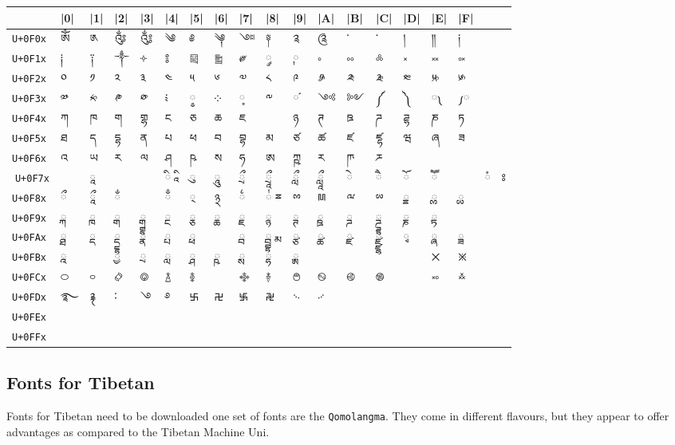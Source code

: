 \bgroup\large\tibetan
\begin{tabular}{llllllllllllllll l}
\toprule
	           &|0|	&|1|	&|2|	&|3|	&|4|	&|5|	&|6|	&|7|	&|8|	&|9|	&|A|	&|B|	&|C|	&|D|	&|E|	&|F|\\
\midrule
\texttt{U+0F0x}	&ༀ	&༁	&༂	&༃	&༄	&༅	&༆	&༇	&༈	&༉	&༊	&་	&༌  &	།	&༎	&༏\\
\midrule
\texttt{U+0F1x} &༐	&༑	&༒	&༓	&༔	&༕	&༖	&༗	&༘&	༙	&༚	&༛	&༜	&༝	&༞	&༟\\
\midrule
\texttt{U+0F2x} &༠	&༡	&༢	&༣	&༤	&༥	&༦	&༧	&༨	&༩	&༪	&༫	&༬	&༭	&༮	&༯\\
\midrule
\texttt{U+0F3x}	&༰ &༱	 &༲ &༳	&༴ &༵	&༶ & ༷	&༸&	༹	&༺&	༻	&༼&	༽	&༾	&༿\\
\midrule
\texttt{U+0F4x} &ཀ	&ཁ	&ག	&གྷ	&ང	&ཅ	&ཆ	&ཇ	&	&ཉ	&ཊ	&ཋ	&ཌ	&ཌྷ	&ཎ	&ཏ\\
\midrule
\texttt{U+0F5x}	 &ཐ	&ད	&དྷ	&ན	&པ	&ཕ	&བ	&བྷ	&མ	&ཙ	&ཚ	&ཛ	&ཛྷ	&ཝ	&ཞ	&ཟ\\
\midrule
\texttt{U+0F6x} &འ	&ཡ	&ར	&ལ	&ཤ	&ཥ	&ས	&ཧ	&ཨ	&ཀྵ	&ཪ	&ཫ	&ཬ	&&&\\
^^A\texttt{U+0F7x}&&	ཱ &	& &ི	ཱི&	ུ&	ཱུ&	ྲྀ&	ཷ&	ླྀ&	ཹ&	ེ&	ཻ&	ོ&	ཽ&	&ཾ	&ཿ\\
\midrule
\texttt{U+0F8x}&    ྀ   & 	ཱྀ&	ྂ&	&ྃ &	྄	&྅&	྆	&྇	ྈ&	ྉ&	ྊ&	ྋ&	ྌ&	ྍ&	ྎ&	ྏ\\
\midrule
\texttt{U+0F9x} &	ྐ&	ྑ   & 	ྒ &	ྒྷ &	ྔ &	ྕ &	ྖ &	ྗ &		ྙ &	ྚ &	ྛ &	ྜ &	ྜྷ &	ྞ &	ྟ\\
\texttt{U+0FAx} &	ྠ &	ྡ &	ྡྷ &	ྣ &	ྤ &	ྥ &		&ྦ	&ྦྷ	ྨ&	ྩ&	ྪ&	ྫ&	ྫྷ&	ྭ&	ྮ&	ྯ\\
\midrule
\texttt{U+0FBx} 
&	  ྰ 
&	
& ྱ  	 
&ྲ	
&ླ	
&ྴ
&	ྵ
&	ྶ
&	ྷ
&ྸ
&
&
&
&	
&྾	
&྿\\
\midrule
\texttt{U+0FCx}	 &࿀&	࿁&	࿂&	࿃&	࿄&	࿅&	&࿇	&࿈	&࿉	&࿊	&࿋	&࿌	&&	࿎	&࿏\\
\midrule
\texttt{U+0FDx}	&࿐	&࿑	&࿒	&࿓	&࿔	&࿕	&࿖	&࿗	&࿘	&࿙	&࿚	&&&&&\\
\midrule
\texttt{U+0FEx} &&&&&&&&&&&&&&&&\\
\midrule
\texttt{U+0FFx}  &&&&&&&&&&&&&&&&\\
\bottomrule
\end{tabular}
\egroup




\subsection{Fonts for Tibetan}

Fonts for Tibetan need to be downloaded one set of fonts are the \texttt{Qomolangma}. They come in different flavours, but they appear
to offer advantages as compared to the Tibetan Machine Uni.
\medskip


